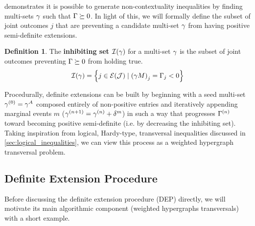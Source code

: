 \documentclass[aps, 10pt, english, twoside, pra, nofootinbib, longbibliography]{revtex4-1}
\theoremstyle{plain}
\theoremstyle{definition}
\newtheorem{definition}[theorem]{Definition}
\theoremstyle{remark}
\newcommand{\inhibit}{\mathcal{I}}
\newcommand{\jointvar}{\mathcal{J}}
\newcommand{\term}[1]{\textcolor{Mahogany}{\textbf{#1}}}
\newcommand{\tcdot}{} %
\newcommand{\Events}[1]{\s{E}\br{#1}} %
\begin{document}
     demonstrates it is possible to generate non-contextuality inequalities by finding multi-sets $\gamma$ such that $\Gamma \succeq 0$. In light of this, we will formally define the subset of joint outcomes $j$ that are preventing a candidate multi-set $\gamma$ from having positive semi-definite extensions.

    \begin{definition}
        The \term{inhibiting set} $\inhibit\br{\ga}$ for a multi-set $\gamma$ is the subset of joint outcomes preventing $\Gamma \succeq 0$ from holding true.
        \[ \inhibit\br{\ga} = \bc{j \in \Events{\jointvar} \mid \br{\ga \tcdot M}_j = \Ga_j < 0} \]
    \end{definition}

    Procedurally, definite extensions can be built by beginning with a seed multi-set $\gamma^{(0)} = \gamma^{A}$ composed entirely of non-positive entries and iteratively appending marginal events $m$ ($\gamma^{(n+1)} = \gamma^{(n)} + \delta^{m}$) in such a way that progresses $\Gamma^{(n)}$ toward becoming positive semi-definite (i.e. by decreasing the inhibiting set). Taking inspiration from logical, Hardy-type, transversal inequalities discussed in \cref{sec:logical_inequalities}, we can view this process as a weighted hypergraph transversal problem.

    \subsection{Definite Extension Procedure}
    \label{sec:dep}
    Before discussing the definite extension procedure (DEP) directly, we will motivate its main algorithmic component (weighted hypergraphs transversals) with a short example.
\end{document}
